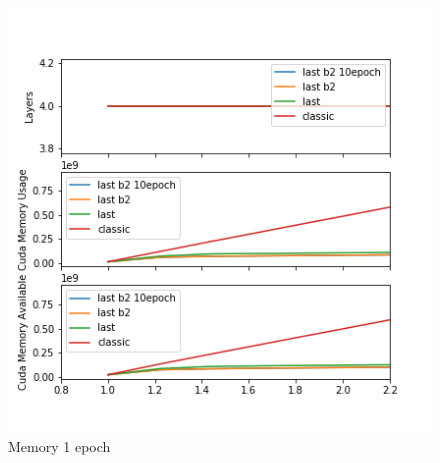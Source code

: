 \begin{figure}[h]
\centering
\includegraphics{parts/appendix/reports-gmsnn/docs_esteban-latex/test_reports/2018-06-12/history_memory_1e.png}
\caption{Memory 1 epoch}
\end{figure}

